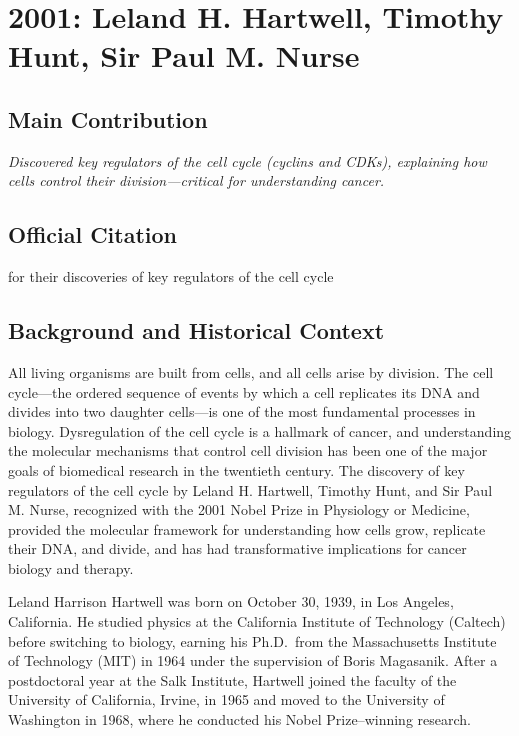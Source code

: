 \chapter[2001 --- Hartwell et al.]{2001: Leland H. Hartwell, Timothy Hunt, Sir Paul M. Nurse}
\label{ch:2001_Hartwell}

\section*{Main Contribution}

\textit{Discovered key regulators of the cell cycle (cyclins and CDKs), explaining how cells control their division---critical for understanding cancer.}\cite{nobel-2001,lecture-2001}

\section{Official Citation}

for their discoveries of key regulators of the cell cycle

\section{Background and Historical Context}

All living organisms are built from cells, and all cells arise by division. The cell cycle---the ordered sequence of events by which a cell replicates its DNA and divides into two daughter cells---is one of the most fundamental processes in biology. Dysregulation of the cell cycle is a hallmark of cancer, and understanding the molecular mechanisms that control cell division has been one of the major goals of biomedical research in the twentieth century. The discovery of key regulators of the cell cycle by Leland H. Hartwell, Timothy Hunt, and Sir Paul M. Nurse, recognized with the 2001 Nobel Prize in Physiology or Medicine, provided the molecular framework for understanding how cells grow, replicate their DNA, and divide, and has had transformative implications for cancer biology and therapy.

Leland Harrison Hartwell was born on October 30, 1939, in Los Angeles, California. He studied physics at the California Institute of Technology (Caltech) before switching to biology, earning his Ph.D.\ from the Massachusetts Institute of Technology (MIT) in 1964 under the supervision of Boris Magasanik. After a postdoctoral year at the Salk Institute, Hartwell joined the faculty of the University of California, Irvine, in 1965 and moved to the University of Washington in 1968, where he conducted his Nobel Prize--winning research.

